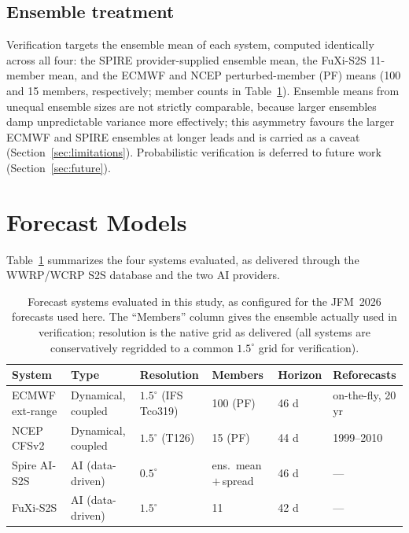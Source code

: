 \documentclass[11pt]{article}
\begin{document}
\subsection{Ensemble treatment}\label{sec:ens}

Verification targets the ensemble mean of each system, computed
identically across all four: the SPIRE provider-supplied ensemble mean,
the FuXi-S2S 11-member mean, and the ECMWF and NCEP perturbed-member
(PF) means (100 and 15 members, respectively; member counts in
Table~\ref{tab:models}). Ensemble means from unequal ensemble sizes are
not strictly comparable, because larger ensembles damp unpredictable
variance more effectively; this asymmetry favours the larger ECMWF and
SPIRE ensembles at longer leads and is carried as a caveat
(Section~\ref{sec:limitations}). Probabilistic verification is deferred
to future work (Section~\ref{sec:future}).

\section{Forecast Models}\label{sec:models}

Table~\ref{tab:models} summarizes the four systems evaluated, as
delivered through the WWRP/WCRP S2S database and the two AI providers.

\begin{table}[t]
  \caption{Forecast systems evaluated in this study, as configured for
  the JFM~2026 forecasts used here. The ``Members'' column gives the
  ensemble actually used in verification; resolution is the native grid
  as delivered (all systems are conservatively regridded to a common
  $1.5^{\circ}$ grid for verification).}
  \label{tab:models}
  \centering
  \small
  \setlength{\tabcolsep}{4pt}
  \begin{tabular}{llllll}
    \toprule
    System & Type & Resolution & Members & Horizon & Reforecasts \\
    \midrule
    ECMWF ext-range & Dynamical, coupled & $1.5^{\circ}$ (IFS Tco319) & 100 (PF) & 46 d & on-the-fly, 20 yr \\
    NCEP CFSv2      & Dynamical, coupled & $1.5^{\circ}$ (T126)       & 15 (PF)  & 44 d & 1999--2010 \\
    Spire AI-S2S    & AI (data-driven)   & $0.5^{\circ}$             & ens.\ mean\,$+$\,spread & 46 d & --- \\
    FuXi-S2S        & AI (data-driven)   & $1.5^{\circ}$             & 11 & 42 d & --- \\
    \bottomrule
  \end{tabular}
\end{table}
\end{document}
